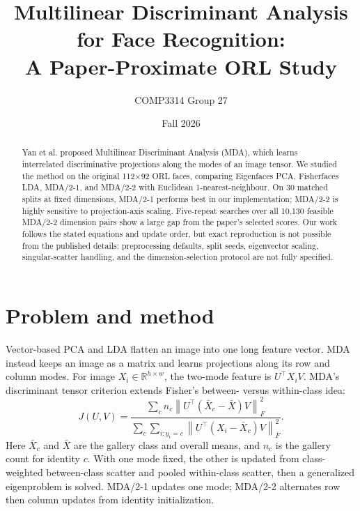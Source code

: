 \documentclass[10pt]{article}
\title{Multilinear Discriminant Analysis for Face Recognition:\\A Paper-Proximate ORL Study}
\author{COMP3314 Group 27}
\date{Fall 2026}
\begin{document}
\maketitle

\begin{abstract}
Yan et al. proposed Multilinear Discriminant Analysis (MDA), which learns interrelated discriminative projections along the modes of an image tensor. We studied the method on the original 112$\times$92 ORL faces, comparing Eigenfaces PCA, Fisherfaces LDA, MDA/2-1, and MDA/2-2 with Euclidean 1-nearest-neighbour. On 30 matched splits at fixed dimensions, MDA/2-1 performs best in our implementation; MDA/2-2 is highly sensitive to projection-axis scaling. Five-repeat searches over all 10,130 feasible MDA/2-2 dimension pairs show a large gap from the paper's selected scores. Our work follows the stated equations and update order, but exact reproduction is not possible from the published details: preprocessing defaults, split seeds, eigenvector scaling, singular-scatter handling, and the dimension-selection protocol are not fully specified.
\end{abstract}

\section{Problem and method}
Vector-based PCA and LDA flatten an image into one long feature vector. MDA instead keeps an image as a matrix and learns projections along its row and column modes. For image $X_i\in\mathbb{R}^{h\times w}$, the two-mode feature is $U^\top X_i V$. MDA's discriminant tensor criterion extends Fisher's between- versus within-class idea:
\begin{equation*}
J(U,V)=
\frac{\sum_c n_c\left\|U^\top(\bar X_c-\bar X)V\right\|_F^2}
{\sum_c\sum_{i:y_i=c}\left\|U^\top(X_i-\bar X_c)V\right\|_F^2}.
\end{equation*}
Here $\bar X_c$ and $\bar X$ are the gallery class and overall means, and $n_c$ is the gallery count for identity $c$. With one mode fixed, the other is updated from class-weighted between-class scatter and pooled within-class scatter, then a generalized eigenproblem is solved. MDA/2-1 updates one mode; MDA/2-2 alternates row then column updates from identity initialization.

\begin{center}
\end{center}
\end{document}
